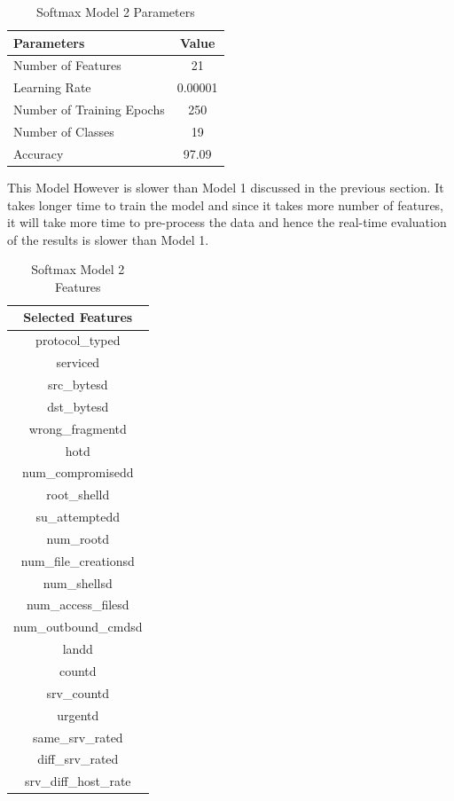 \documentclass[12pt]{article}
\theoremstyle{definition}
\begin{document}
		\begin{table}[h!]
			\centering
			\caption{Softmax Model 2 Parameters}
			\label{tab:model-2-params}
			\begin{tabular}{|l|c|}
				\hline
				\bfseries{Parameters} & \textbf{Value} \\ \hline
				Number of Features & 21 \\
				Learning Rate & 0.00001 \\
				Number of Training Epochs & 250 \\
				Number of Classes & 19 \\ 
				Accuracy & 97.09 \\
				\hline	
			\end{tabular}
			
		\end{table}
		This Model However is slower than Model 1 discussed in the previous section. It takes longer time to train the model and since it takes more number of features, it will take more time to pre-process the data and hence the real-time evaluation of the results is slower than Model 1.
		\begin{table}[h!]
			\centering
			\caption{Softmax Model 2 Features}
			\label{tab:model-2-features}
			\begin{tabular}{|c|}
				\hline
				\bfseries{Selected Features} \\ \hline
					protocol\_typed \\
					serviced \\
					src\_bytesd \\
					dst\_bytesd \\
					wrong\_fragmentd \\
					hotd \\
					num\_compromisedd \\
					root\_shelld \\
					su\_attemptedd \\
					num\_rootd \\
					num\_file\_creationsd \\
					num\_shellsd \\
					num\_access\_filesd \\
					num\_outbound\_cmdsd \\
					landd \\
					countd \\
					srv\_countd \\
					urgentd \\
					same\_srv\_rated \\
					diff\_srv\_rated \\
					srv\_diff\_host\_rate\\
				\hline	
			\end{tabular}
		\end{table}
	
\end{document}

